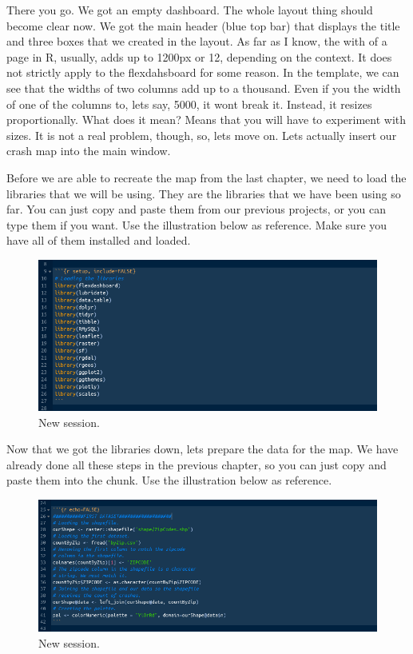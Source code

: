 \documentclass[]{book}
\begin{document}
There you go. We got an empty dashboard. The whole layout thing should become clear now. We got the main header (blue top bar) that displays the title and three boxes that we created in the layout. As far as I know, the with of a page in R, usually, adds up to 1200px or 12, depending on the context. It does not strictly apply to the flexdahsboard for some reason. In the template, we can see that the widths of two columns add up to a thousand. Even if you the width of one of the columns to, lets say, 5000, it wont break it. Instead, it resizes proportionally. What does it mean? Means that you will have to experiment with sizes. It is not a real problem, though, so, lets move on. Lets actually insert our crash map into the main window.

Before we are able to recreate the map from the last chapter, we need to load the libraries that we will be using. They are the libraries that we have been using so far. You can just copy and paste them from our previous projects, or you can type them if you want. Use the illustration below as reference. Make sure you have all of them installed and loaded.

\begin{figure}
\centering
\includegraphics{flex5.png}
\caption{New session.}
\end{figure}

Now that we got the libraries down, lets prepare the data for the map. We have already done all these steps in the previous chapter, so you can just copy and paste them into the chunk. Use the illustration below as reference.

\begin{figure}
\centering
\includegraphics{flex6.png}
\caption{New session.}
\end{figure}
\end{document}
